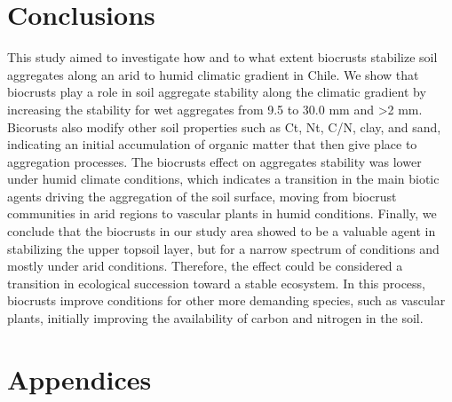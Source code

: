{\section{Conclusions}

This study aimed to investigate how and to what extent biocrusts stabilize soil aggregates along an arid to humid climatic gradient in Chile. We show that biocrusts play a role in soil aggregate stability along the climatic gradient by increasing the stability for wet aggregates from 9.5 to 30.0 mm and >2 mm. Bicorusts also modify other soil properties such as Ct, Nt, C/N, clay, and sand, indicating an initial accumulation of organic matter that then give place to aggregation processes. The biocrusts effect on aggregates stability was lower under humid climate conditions, which indicates a transition in the main biotic agents driving the aggregation of the soil surface, moving from biocrust communities in arid regions to vascular plants in humid conditions.
Finally, we conclude that the biocrusts in our study area showed to be a valuable agent in stabilizing the upper topsoil layer, but for a narrow spectrum of conditions and mostly under arid conditions. Therefore, the effect could be considered a transition in ecological succession toward a stable ecosystem. In this process, biocrusts improve conditions for other more demanding species, such as vascular plants, initially improving the availability of carbon and nitrogen in the soil.

\section*{Appendices}

}
